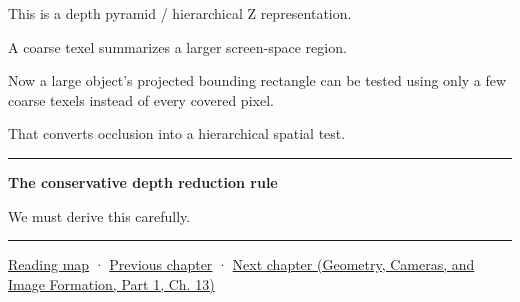 This is a depth pyramid / hierarchical Z representation.

A coarse texel summarizes a larger screen-space region.

Now a large object's projected bounding rectangle can be tested using only a few coarse texels instead of every covered pixel.

That converts occlusion into a hierarchical spatial test.

\begin{center}\rule{0.5\linewidth}{0.5pt}\end{center}

\textbf{The conservative depth reduction rule}

We must derive this carefully.

\begin{center}\rule{0.5\linewidth}{0.5pt}\end{center}

\hyperref[volume-reading-map]{Reading map} · \hyperref[06-engine-ii-ch028-bvh-traversal-refitting-and-simd]{Previous chapter} · \href{../03-Geometry-Cameras-and-Image-Formation-P01/main.pdf\#nameddest=06-engine-ii-ch030-depth-projection-and-shadow-map-precision}{Next chapter (Geometry, Cameras, and Image Formation, Part 1, Ch. 13)}
